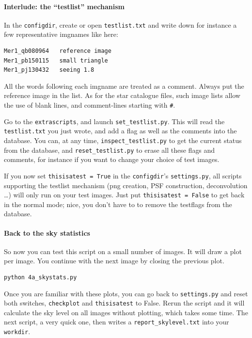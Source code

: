 \paragraph{Interlude: the ``testlist'' mechanism}

In the \verb+configdir+, create or open \verb+testlist.txt+ and write down for instance a few representative imgnames like here:

\begin{Verbatim}[fontsize=\relsize{-2}]
Mer1_qb080964	reference image
Mer1_pb150115	small triangle
Mer1_pj130432	seeing 1.8
\end{Verbatim}

All the words following each imgname are treated as a comment. Always put the reference image in the list. As for the star catalogue files, such image lists allow the use of blank lines, and comment-lines starting with \verb+#+.

Go to the \verb+extrascripts+, and launch \verb+set_testlist.py+. This will read the \verb+testlist.txt+ you just wrote, and add a flag as well as the comments into the database. You can, at any time, \verb+inspect_testlist.py+ to get the current status from the database, and \verb+reset_testlist.py+ to erase all these flags and comments, for instance if you want to change your choice of test images.

If you now set \verb+thisisatest = True+ in the \verb+configdir+'s \verb+settings.py+, all scripts supporting the testlist mechanism (png creation, PSF construction, deconvolution \ldots) will only run on your test images. Just put  \verb+thisisatest = False+ to get back in the normal mode; nice, you don't have to to remove the testflags from the database.

\paragraph{Back to the sky statistics}

So now you can test this script on a small number of images. It will draw a plot per image. You continue with the next image by closing the previous plot.

\begin{Verbatim}
python 4a_skystats.py 
\end{Verbatim}
Once you are familiar with these plots, you can go back to \verb+settings.py+ and reset both switches, \verb+checkplot+ and \verb+thisisatest+ to False. Rerun the script and it will calculate the sky level on all images without plotting, which takes some time. The next script, a very quick one, then writes a \verb+report_skylevel.txt+ into your \verb+workdir+.

